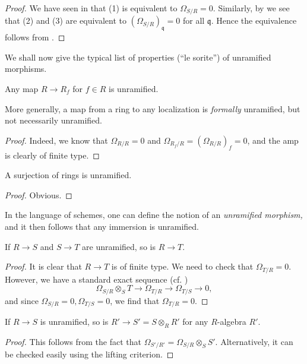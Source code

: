 \begin{proof}
We have seen in
that (1) is equivalent to
$\Omega_{S/R} = 0$. Similarly, by
we see that (2) and (3)
are equivalent to $(\Omega_{S/R})_{\mathfrak q} = 0$ for all
$\mathfrak q$. Hence the equivalence follows from
.
\end{proof}

We shall now give the typical list of properties (``le sorite'') of unramified morphisms.

\begin{proposition} \label{locunramified}
Any map $R \to R_f$ for $f \in  R$ is unramified.
\end{proposition} 
More generally, a map from a ring to any localization is \emph{formally}
unramified, but not necessarily unramified. 
\begin{proof} 
Indeed, we know that $\Omega_{R/R}  = 0$ and $\Omega_{R_f/R } =
(\Omega_{R/R})_f=0$, and the amp is clearly of finite type.
\end{proof} 

\begin{proposition} 
A surjection of rings is unramified.
\end{proposition} 
\begin{proof} 
Obvious.
\end{proof} 

In the language of schemes, one can define the notion of an \emph{unramified
morphism,} and it then follows that any immersion is unramified.

\begin{proposition} 
If $R \to S$ and $S \to T$ are unramified, so is $R \to T$.
\end{proposition} 
\begin{proof} 
It is clear that $R \to T$ is of finite type. We need to check that
$\Omega_{T/R}  = 0$. However, we have a standard exact sequence (cf.
\cite{Ei95})
\[ \Omega_{S/R}\otimes_S T \to \Omega_{T/R} \to \Omega_{T/S} \to 0,  \]
and since $\Omega_{S/R} = 0, \Omega_{T/S} = 0$, we find that $\Omega_{T/R}  =
0$.
\end{proof} 


\begin{proposition}  \label{unrbasechange}
If $R \to S$ is unramified, so is $R' \to S' = S \otimes_R R'$ for any $R$-algebra
$R'$.
\end{proposition} 
\begin{proof} 
This follows from the fact that $\Omega_{S'/R'} = \Omega_{S/R} \otimes_S S'$.
Alternatively, it can be checked easily using the lifting criterion.
\end{proof} 


